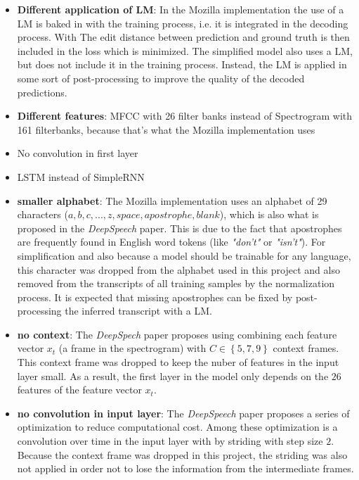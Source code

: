 \begin{itemize}
	\item \textbf{\ac{Different application of LM}}: In the Mozilla implementation the use of a \ac{LM} is baked in with the training process, i.e. it is integrated in the decoding process. With The edit distance between prediction and ground truth is then included in the loss which is minimized. The simplified model also uses a \ac{LM}, but does not include it in the training process. Instead, the \ac{LM} is applied in some sort of post-processing to improve the quality of the decoded predictions.
	\item \textbf{Different features}: MFCC with 26 filter banks instead of Spectrogram with 161 filterbanks, because that's what the Mozilla implementation uses
	\item No convolution in first layer
	\item LSTM instead of SimpleRNN
	\item \textbf{smaller alphabet}: The Mozilla implementation uses an alphabet of 29 characters (${a,b,c,...,z, space, apostrophe, blank}$), which is also what is proposed in the \textit{DeepSpeech} paper. This is due to the fact that apostrophes are frequently found in English word tokens (like \textit{"don't"} or \textit{"isn't"}). For simplification and also because a model should be trainable for any language, this character was dropped from the alphabet used in this project and also removed from the transcripts of all training samples by the normalization process. It is expected that missing apostrophes can be fixed by post-processing the inferred transcript with a \ac{LM}.
	\item \textbf{no context}: The \textit{DeepSpech} paper proposes using combining each feature vector $x_t$ (a frame in the spectrogram) with $C \in \left\{ 5,7,9 \right\}$ context frames. This context frame was dropped to keep the nuber of features in the input layer small. As a result, the first layer in the model only depends on the $26$ features of the feature vector $x_t$.
	\item \textbf{no convolution in input layer}: The \textit{DeepSpeech} paper proposes a series of optimization to reduce computational cost. Among these optimization is a convolution over time in the input layer with by striding with step size $2$. Because the context frame was dropped in this project, the striding was also not applied in order not to lose the information from the intermediate frames.
\end{itemize}



